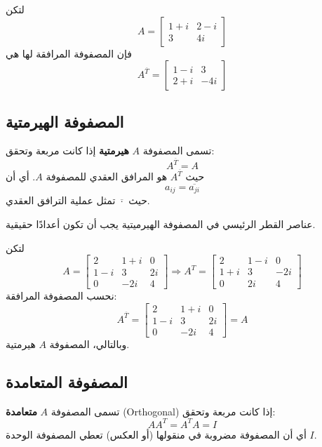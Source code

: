 	\begin{example}
		
		لتكن
		\[
		A =
		\begin{bmatrix}
			1+i & 2-i \\
			3 & 4i
		\end{bmatrix}
		\]
		فإن المصفوفة المرافقة لها هي
		\[
		A^{\overline{T}} =
		\begin{bmatrix}
			1-i & 3\\
			2+i & -4i
		\end{bmatrix}
		\]
		
	\end{example}
	
	\subsection{المصفوفة الهيرمتية}
	تسمى المصفوفة $A$ \textbf{هيرمتية} إذا كانت مربعة وتحقق:
	\[
	A^{\overline{T}} = A
	\]
	حيث $A^{\overline{T}}$ هو المرافق العقدي للمصفوفة $A$. أي أن
	\[
	a_{ij} = \overline{a_{ji}}
	\]
	حيث $\overline{\cdot}$ تمثل عملية الترافق العقدي.
	
	\begin{note}
		عناصر القطر الرئيسي في المصفوفة الهيرميتية يجب أن تكون أعدادًا حقيقية.
	\end{note}
	
	\begin{example}
		
		لتكن
		\[
		A =
		\begin{bmatrix}
			2 & 1+i & 0 \\
			1-i & 3 & 2i \\
			0 & -2i & 4
		\end{bmatrix}
		\Rightarrow
		A^T = 
		\begin{bmatrix}
			2 & 1-i & 0\\
			1+i & 3 & -2i\\
			0 & 2i & 4
		\end{bmatrix}
		\]
		نحسب المصفوفة المرافقة:
		\[
		A^{\overline{T}} =
		\begin{bmatrix}
			2 & 1+i & 0 \\
			1-i & 3 & 2i \\
			0 & -2i & 4
		\end{bmatrix} = A
		\]
		وبالتالي، المصفوفة $A$ هيرمتية.
	\end{example}
	
	\subsection{المصفوفة المتعامدة}
	تسمى المصفوفة $A$ \textbf{متعامدة} (Orthogonal) إذا كانت مربعة وتحقق:
	\[
	A A^T = A^T A = I
	\]
	أي أن المصفوفة مضروبة في منقولها (أو العكس) تعطي المصفوفة الوحدة $I$.
	
